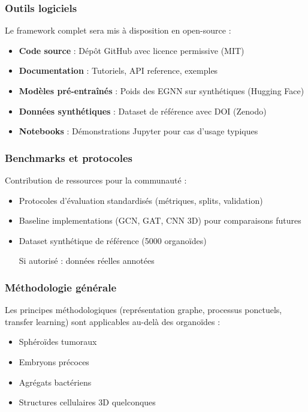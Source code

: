 \subsubsection{Outils logiciels}

Le framework complet sera mis à disposition en open-source :
\begin{itemize}
    \item \textbf{Code source} : Dépôt GitHub avec licence permissive (MIT)
    \item \textbf{Documentation} : Tutoriels, API reference, exemples
    \item \textbf{Modèles pré-entraînés} : Poids des EGNN sur synthétiques (Hugging Face)
    \item \textbf{Données synthétiques} : Dataset de référence avec DOI (Zenodo)
    \item \textbf{Notebooks} : Démonstrations Jupyter pour cas d'usage typiques
\end{itemize}

\subsubsection{Benchmarks et protocoles}

Contribution de ressources pour la communauté :
\begin{itemize}
    \item Protocoles d'évaluation standardisés (métriques, splits, validation)
    \item Baseline implementations (GCN, GAT, CNN 3D) pour comparaisons futures
    \item Dataset synthétique de référence (5000 organoïdes)
    \item [Si autorisé : données réelles annotées]
\end{itemize}

\subsubsection{Méthodologie générale}

Les principes méthodologiques (représentation graphe, processus ponctuels, transfer learning) sont applicables au-delà des organoïdes :
\begin{itemize}
    \item Sphéroïdes tumoraux
    \item Embryons précoces
    \item Agrégats bactériens
    \item Structures cellulaires 3D quelconques
\end{itemize}

